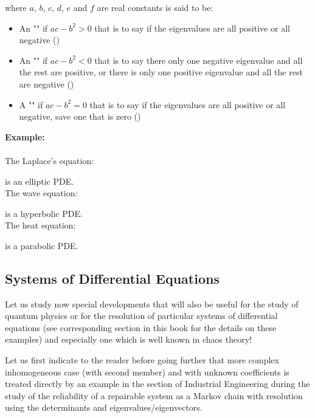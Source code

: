 	where $a$, $b$, $c$, $d$, $e$ and $f$ are real constants is said to be:
	\begin{itemize}
		\item An "" if $ac-b^2>0$ that is to say if the eigenvalues are all positive or all negative ()

		\item An "" if $ac-b^2<0$ that is to say there only one negative eigenvalue and all the rest are positive, or there is only one positive eigenvalue and all the rest are negative ()

		\item A "" if $ac-b^2=0$ that is to say if the eigenvalues are all positive or all negative, save one that is zero ()
	\end{itemize}

	\begin{tcolorbox}[colframe=black,colback=white,sharp corners]
	\textbf{{\Large {}}Example:}\\\\
	The Laplace's equation:
	
	is an elliptic PDE.\\

	The wave equation:
	
	is a hyperbolic PDE.\\

	The heat equation:
	
	is a parabolic PDE.
	\end{tcolorbox}
	
	\pagebreak
	\subsection{Systems of Differential Equations}
	Let us study now special developments that will also be useful for the study of quantum physics or for the resolution of particular systems of differential equations (see corresponding section in this book for the details on these examples) and especially one which is well known in chaos theory!
	
	Let us first indicate to the reader before going further that more complex inhomogeneous case (with second member) and with unknown coefficients is treated directly by an example in the section of Industrial Engineering during the study of the reliability of a repairable system as a Markov chain with resolution using the determinants and eigenvalues/eigenvectors.
	
